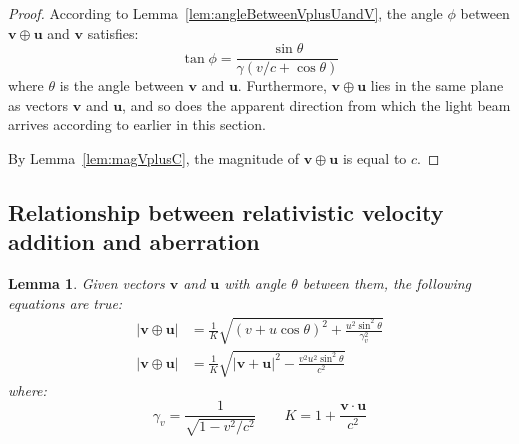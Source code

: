 \documentclass[a4paper]{article}
\theoremstyle{plain}
\newtheorem{lemma}[theorem]{Lemma}
\theoremstyle{definition}
\newcommand{\vect}[1]{\mathbf{#1}}
\begin{document}
\begin{proof}
According to Lemma~\ref{lem:angleBetweenVplusUandV}, the angle $\phi$
between $\vect{v} \oplus \vect{u}$ and $\vect{v}$ satisfies:
\begin{equation}
\tan \phi = \frac{\sin \theta}{\gamma(v/c + \cos \theta)}
\end{equation}
where $\theta$ is the angle between $\vect{v}$ and $\vect{u}$.
Furthermore, $\vect{v} \oplus \vect{u}$ lies in the same plane as
vectors $\vect{v}$ and $\vect{u}$, and so does the apparent direction
from which the light beam arrives according to earlier in this
section.

By Lemma~\ref{lem:magVplusC}, the magnitude of $\vect{v} \oplus
\vect{u}$ is equal to $c$.
\end{proof}


\subsection{Relationship between relativistic velocity addition and aberration}

\begin{lemma}
\label{lem:magnitudeRelVecPlus1}
Given vectors $\vect{v}$ and $\vect{u}$
with angle $\theta$ between them,
the following equations are true:
\begin{align}
|\vect{v} \oplus \vect{u}|
  & = \frac{1}{K} \sqrt{(v + u \cos \theta)^2 + \frac{u^2 \sin^2 \theta}{\gamma_v^2}} \label{eqn:lemmavplusupart1} \\
|\vect{v} \oplus \vect{u}|
  & = \frac{1}{K} \sqrt{|\vect{v} + \vect{u}|^2 - \frac{v^2 u^2 \sin^2 \theta}{c^2}} \label{eqn:lemmavplusupart3}
\end{align}
where:
\begin{equation}
\gamma_v = \frac{1}{\sqrt{1-v^2/c^2}}  \qquad
K = 1 + \frac{\vect{v} \cdot \vect{u}}{c^2}
\end{equation}
\end{lemma}
\end{document}
